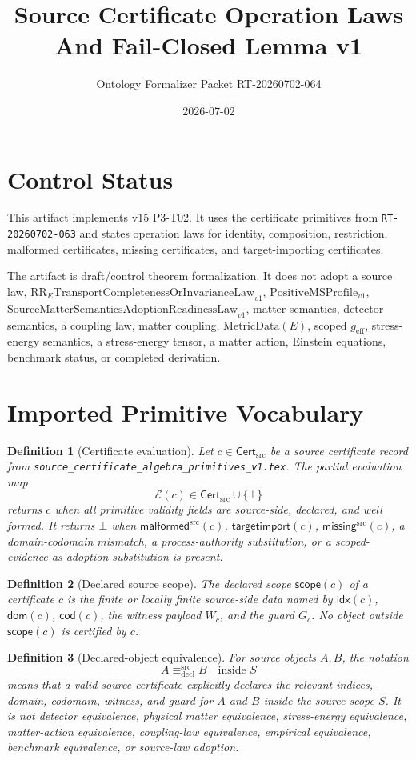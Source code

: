\documentclass[11pt]{article}
\title{Source Certificate Operation Laws And Fail-Closed Lemma v1}
\author{Ontology Formalizer Packet RT-20260702-064}
\date{2026-07-02}
\newcommand{\CertSrc}{\mathsf{Cert}_{\mathrm{src}}}
\newcommand{\Cdom}{\mathsf{dom}}
\newcommand{\Ccod}{\mathsf{cod}}
\newcommand{\Cidx}{\mathsf{idx}}
\newcommand{\CMalformed}{\mathsf{malformed}^{\mathrm{src}}}
\newcommand{\CMissing}{\mathsf{missing}^{\mathrm{src}}}
\newcommand{\Bottom}{\bot}
\newcommand{\TargetImport}{\mathsf{targetimport}}
\newcommand{\Scope}{\mathsf{scope}}
\newcommand{\DeclEq}{\equiv_{\mathrm{decl}}^{\mathrm{src}}}
\newcommand{\RRELaw}{\mathrm{RR}_{E}\mathrm{TransportCompletenessOrInvarianceLaw}_{v1}}
\newcommand{\PositiveMSProfile}{\mathrm{PositiveMSProfile}_{v1}}
\newcommand{\SMSAR}{\mathrm{SourceMatterSemanticsAdoptionReadinessLaw}_{v1}}
\newcommand{\MetricData}{\mathrm{MetricData}}
\newcommand{\geff}{g_{\mathrm{eff}}}
\newtheorem{definition}{Definition}
\begin{document}
\maketitle

\section{Control Status}

This artifact implements v15 P3-T02. It uses the certificate primitives from
\texttt{RT-20260702-063} and states operation laws for identity,
composition, restriction, malformed certificates, missing certificates, and
target-importing certificates.

The artifact is draft/control theorem formalization. It does not adopt a
source law, \(\RRELaw\), \(\PositiveMSProfile\), \(\SMSAR\), matter semantics,
detector semantics, a coupling law, matter coupling, \(\MetricData(E)\),
scoped \(\geff\), stress-energy semantics, a stress-energy tensor, a matter
action, Einstein equations, benchmark status, or completed derivation.

\section{Imported Primitive Vocabulary}

\begin{definition}[Certificate evaluation]
Let \(c\in\CertSrc\) be a source certificate record from
\texttt{source\_certificate\_algebra\_primitives\_v1.tex}. The partial
evaluation map
\[
  \mathcal E(c)\in \CertSrc\cup\{\Bottom\}
\]
returns \(c\) when all primitive validity fields are source-side, declared,
and well formed. It returns \(\Bottom\) when \(\CMalformed(c)\),
\(\TargetImport(c)\), \(\CMissing(c)\), a domain-codomain mismatch, a
process-authority substitution, or a scoped-evidence-as-adoption substitution
is present.
\end{definition}

\begin{definition}[Declared source scope]
The declared scope \(\Scope(c)\) of a certificate \(c\) is the finite or
locally finite source-side data named by \(\Cidx(c)\), \(\Cdom(c)\),
\(\Ccod(c)\), the witness payload \(W_c\), and the guard \(G_c\). No object
outside \(\Scope(c)\) is certified by \(c\).
\end{definition}

\begin{definition}[Declared-object equivalence]
For source objects \(A,B\), the notation
\[
  A \DeclEq B \quad \text{inside } S
\]
means that a valid source certificate explicitly declares the relevant
indices, domain, codomain, witness, and guard for \(A\) and \(B\) inside the
source scope \(S\). It is not detector equivalence, physical matter
equivalence, stress-energy equivalence, matter-action equivalence,
coupling-law equivalence, empirical equivalence, benchmark equivalence, or
source-law adoption.
\end{definition}
\end{document}
